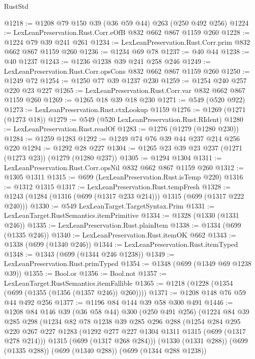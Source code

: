 \begin{lexlean}{RustStd}
\begin{coremodule}
@1218 := @1208 @79 @150 @39 (@36 @59 @44) @263 (@250 @492 @256)
@1224 := LexLeanPreservation.Rust.Corr.eOfB @832 @662 @867 @1159 @260
@1228 := @1224 @79 @39 @241 @261
@1234 := LexLeanPreservation.Rust.Corr.prim @832 @662 @867 @1159 @260
@1236 := @1234 @69 @78
@1237 := @40 @44
@1238 := @40 @1237
@1243 := @1236 @1238 @39 @241 @258 @246
@1249 := LexLeanPreservation.Rust.Corr.opsCons @832 @662 @867 @1159 @260
@1250 := @1249 @72
@1254 := @1250 @77 @39 @1237 @230
@1259 := @1254 @240 @257 @220 @23 @227
@1265 := LexLeanPreservation.Rust.Corr.var @832 @662 @867 @1159 @260
@1269 := @1265 @18 @39 @18 @230
@1271 := @549 (@520 @922)
@1273 := LexLeanPreservation.Rust.ctxLookup @1159
@1276 := @1269 (@1271 (@1273 @18))
@1279 := @549 (@520 LexLeanPreservation.Rust.RIdent)
@1280 := LexLeanPreservation.Rust.readOf
@1283 := @1276 (@1279 (@1280 @230))
@1284 := @1259 @1283
@1292 := @1249 @74 @76 @39 @44 @237 @214 @256 @220
@1294 := @1292 @28 @227
@1304 := @1265 @23 @39 @23 @237 (@1271 (@1273 @23)) (@1279 (@1280 @237))
@1305 := @1294 @1304
@1311 := LexLeanPreservation.Rust.Corr.opsNil @832 @662 @867 @1159 @260
@1312 := @1305 @1311
@1315 := @699 (LexLeanPreservation.Rust.isTemp @220)
@1316 := @1312 @1315
@1317 := LexLeanPreservation.Rust.tempFresh
@1328 := @1243 (@1284 (@1316 (@699 (@1317 @233 @214))) @1315 (@699 (@1317 @222 @240)))
@1330 := @549 LexLeanTarget.TargetSyntax.Prim
@1331 := LexLeanTarget.RustSemantics.itemPrimitive
@1334 := @1328 (@1330 (@1331 @246))
@1335 := LexLeanPreservation.Rust.plainItem
@1338 := @1334 (@699 (@1335 @246))
@1340 := LexLeanPreservation.Rust.itemOK @662
@1343 := @1338 (@699 (@1340 @246))
@1344 := LexLeanPreservation.Rust.itemTyped
@1348 := @1343 (@699 (@1344 @246 @1238))
@1349 := LexLeanPreservation.Rust.primTyped
@1354 := @1348 (@699 (@1349 @69 @1238 @39))
@1355 := Bool.or
@1356 := Bool.not
@1357 := LexLeanTarget.RustSemantics.itemFallible
@1365 := @1218 (@1228 (@1354 (@699 (@1355 (@1356 (@1357 @246)) @260))))
@1371 := @1208 @148 @76 @59 @44 @492 @256
@1377 := @1196 @84 @144 @39 @58 @300 @491
@1446 := @1208
    @84
    @146
    @39
    (@36 @58 @44)
    @300
    (@250 @491 @256)
    (@1224
      @84
      @39
      @285
      @298
      (@1234
        @82
        @78
        @1238
        @39
        @285
        @296
        @288
        (@1254
          @284
          @295
          @220
          @267
          @227
          @1283
          (@1292 @277 @227 @1304 @1311 @1315 (@699 (@1317 @278 @214)))
          @1315
          (@699 (@1317 @268 @284)))
        (@1330 (@1331 @288))
        (@699 (@1335 @288))
        (@699 (@1340 @288))
        (@699 (@1344 @288 @1238))

\end{coremodule}
\end{lexlean}

